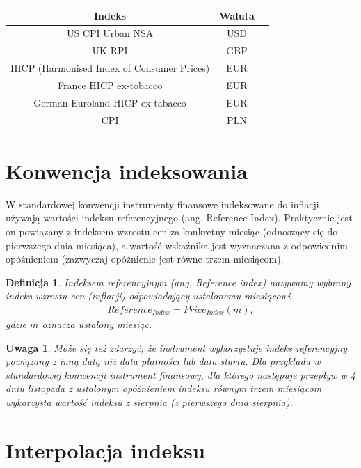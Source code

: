 \documentclass{mini}
\theoremstyle{mythstyle}
\newtheorem{Definicja}{Definicja}[chapter]
\newtheorem{Uwaga}{Uwaga}[chapter]
\begin{document}
	\begin{center}
		\begin{tabular}{c  c c}
			\textbf{Indeks} & \textbf{Waluta}  \\ \hline
			US CPI Urban NSA & USD \\
			UK RPI & GBP \\
			HICP (Harmonised Index of Consumer Prices) & EUR \\
			France HICP ex-tobacco & EUR \\
			German Euroland HICP ex-tabacco & EUR  \\
			CPI & PLN \\
		\end{tabular}
	\end{center}

	\section{Konwencja indeksowania}
	
	W standardowej konwencji instrumenty finansowe indeksowane do inflacji używają wartości indeksu referencyjnego (ang. Reference Index). Praktycznie jest on powiązany z indeksem wzrostu cen za konkretny miesiąc (odnoszący się do pierwszego dnia miesiąca), a wartość wskaźnika jest wyznaczana z odpowiednim opóźnieniem (zazwyczaj opóźnienie jest równe trzem miesiącom).\\
	
	\begin{Definicja}
		Indeksem referencyjnym (ang, Reference index) nazywamy wybrany indeks wzrostu cen (inflacji) odpowiadający ustalonemu miesiącowi
	\begin{eqnarray*}
		Reference_{Index} = Price_{Index}(m),
	\end{eqnarray*}
	gdzie $m$ oznacza ustalony miesiąc.\\
	\end{Definicja}

	\begin{Uwaga}
	Może się też zdarzyć, że instrument wykorzystuje indeks referencyjny powiązany z inną datą niż data płatności lub data startu. Dla przykładu w standardowej konwencji instrument finansowy, dla którego następuje przepływ w 4 dniu listopada z ustalonym opóźnieniem indeksu równym trzem miesiącom wykorzysta wartość indeksu z sierpnia (z pierwszego dnia sierpnia). 
	\end{Uwaga}
	
	\section{Interpolacja indeksu}
	
\end{document}
